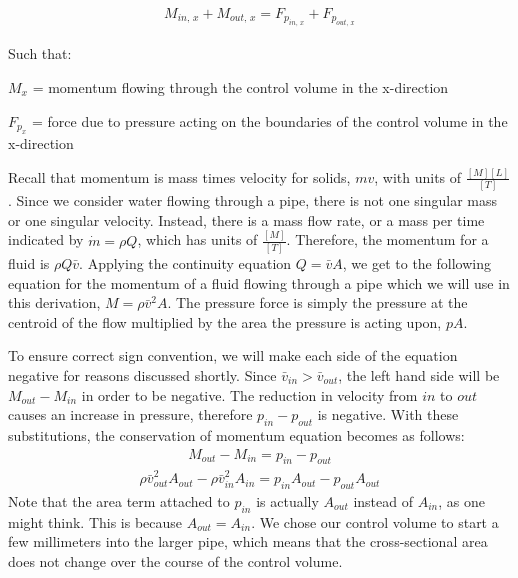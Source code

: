 \documentclass[letterpaper,10pt,english]{sphinxmanual}
\begin{document}
\begin{equation}\label{equation:Fluids_Review/Fluids_Review_Derivations:Fluids_Review/Fluids_Review_Derivations:3}
\begin{split}M_{in, \, x} + M_{out, \, x} = F_{p_{in, \, x}} + F_{p_{out, \, x}}\end{split}
\end{equation}
\begin{DUlineblock}{0em}
\item[] Such that:
\item[] \(M_{x}\) = momentum flowing through the control volume in the x-direction
\item[] \(F_{p_x}\) = force due to pressure acting on the boundaries of the control volume in the x-direction
\end{DUlineblock}

Recall that momentum is mass times velocity for solids, \(m v\), with units of \(\frac{[M][L]}{[T]}\). Since we consider water flowing through a pipe, there is not one singular mass or one singular velocity. Instead, there is a mass flow rate, or a mass per time indicated by \(\dot m = \rho Q\), which has units of \(\frac{[M]}{[T]}\). Therefore, the momentum for a fluid is \(\rho Q \bar v\). Applying the continuity equation \(Q = \bar v A\), we get to the following equation for the momentum of a fluid flowing through a pipe which we will use in this derivation, \(M = \rho \bar v^2 A\). The pressure force is simply the pressure at the centroid of the flow multiplied by the area the pressure is acting upon, \(p A\).

To ensure correct sign convention, we will make each side of the equation negative for reasons discussed shortly. Since \(\bar v_{in} > \bar v_{out}\), the left hand side will be \(M_{out} - M_{in}\) in order to be negative. The reduction in velocity from \(in\) to \(out\) causes an increase in pressure, therefore \(p_{in} - p_{out}\) is negative. With these substitutions, the conservation of momentum equation becomes as follows:
\begin{equation}\label{equation:Fluids_Review/Fluids_Review_Derivations:Fluids_Review/Fluids_Review_Derivations:4}
\begin{split}M_{out} - M_{in} = p_{in} - p_{out}\end{split}
\end{equation}\begin{equation}\label{equation:Fluids_Review/Fluids_Review_Derivations:Fluids_Review/Fluids_Review_Derivations:5}
\begin{split}\rho \bar v_{out}^2 A_{out} - \rho \bar v_{in}^2 A_{in} = p_{in} A_{out} - p_{out} A_{out}\end{split}
\end{equation}
Note that the area term attached to \(p_{in}\) is actually \(A_{out}\) instead of \(A_{in}\), as one might think. This is because \(A_{out} = A_{in}\). We chose our control volume to start a few millimeters into the larger pipe, which means that the cross-sectional area does not change over the course of the control volume.
\end{document}
